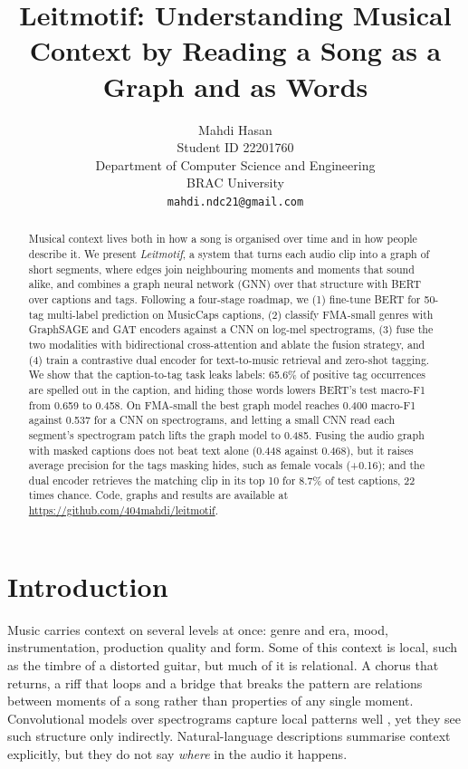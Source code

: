 \documentclass{article}
\title{Leitmotif: Understanding Musical Context by Reading a Song as a Graph and as Words}
\author{%
  Mahdi Hasan\\
  Student ID 22201760\\
  Department of Computer Science and Engineering\\
  BRAC University\\
  \texttt{mahdi.ndc21@gmail.com}
}
\begin{document}
\maketitle

\begin{abstract}
Musical context lives both in how a song is organised over time and in how people describe it. We present
\emph{Leitmotif}, a system that turns each audio clip into a graph of short segments, where edges join neighbouring
moments and moments that sound alike, and combines a graph neural network (GNN) over that structure with BERT over
captions and tags. Following a four-stage roadmap, we (1) fine-tune BERT for 50-tag multi-label prediction on
MusicCaps captions, (2) classify FMA-small genres with GraphSAGE and GAT encoders against a CNN on log-mel
spectrograms, (3) fuse the two modalities with bidirectional cross-attention and ablate the fusion strategy, and
(4) train a contrastive dual encoder for text-to-music retrieval and zero-shot tagging. We show that the
caption-to-tag task leaks labels: 65.6\% of positive tag occurrences are spelled out in the caption, and hiding
those words lowers BERT's test macro-F1 from 0.659 to 0.458. On FMA-small the best graph model reaches 0.400
macro-F1 against 0.537 for a CNN on spectrograms, and letting a small CNN read each segment's spectrogram patch lifts
the graph model to 0.485. Fusing the audio graph with masked captions does not beat text alone (0.448 against 0.468),
but it raises average precision for the tags masking hides, such as female vocals (+0.16); and the dual encoder
retrieves the matching clip in its top 10 for 8.7\% of test captions, 22 times chance. Code, graphs and results are
available at \url{https://github.com/404mahdi/leitmotif}.
\end{abstract}

\section{Introduction}

Music carries context on several levels at once: genre and era, mood, instrumentation, production quality and form.
Some of this context is local, such as the timbre of a distorted guitar, but much of it is relational. A chorus that
returns, a riff that loops and a bridge that breaks the pattern are relations between moments of a song rather than
properties of any single moment. Convolutional models over spectrograms capture local patterns well
\citep{choi2016tagging}, yet they see such structure only indirectly. Natural-language descriptions summarise context
explicitly, but they do not say \emph{where} in the audio it happens.
\end{document}

